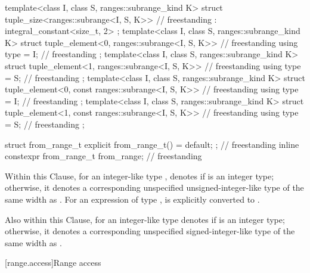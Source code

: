 \begin{codeblock}
{  template<class I, class S, ranges::subrange_kind K>
  struct tuple_size<ranges::subrange<I, S, K>>                                      // freestanding
    : integral_constant<size_t, 2> {};
  template<class I, class S, ranges::subrange_kind K>
  struct tuple_element<0, ranges::subrange<I, S, K>> {                              // freestanding
    using type = I;                                                                 // freestanding
  };
  template<class I, class S, ranges::subrange_kind K>
  struct tuple_element<1, ranges::subrange<I, S, K>> {                              // freestanding
    using type = S;                                                                 // freestanding
  };
  template<class I, class S, ranges::subrange_kind K>
  struct tuple_element<0, const ranges::subrange<I, S, K>> {                        // freestanding
    using type = I;                                                                 // freestanding
  };
  template<class I, class S, ranges::subrange_kind K>
  struct tuple_element<1, const ranges::subrange<I, S, K>> {                        // freestanding
    using type = S;                                                                 // freestanding
  };

  struct from_range_t { explicit from_range_t() = default; };                       // freestanding
  inline constexpr from_range_t from_range{};                                       // freestanding
}
\end{codeblock}

\pnum
{}%
%
Within this Clause,
for an integer-like type ,
 denotes
 if  is an integer type;
otherwise, it denotes a corresponding unspecified unsigned-integer-like type
of the same width as .
For an expression  of type ,
 is
 explicitly converted to
.

\pnum
Also within this Clause,
 for an integer-like type 
denotes  if  is an integer type;
otherwise, it denotes a corresponding unspecified signed-integer-like type
of the same width as .

[range.access]{Range access}

